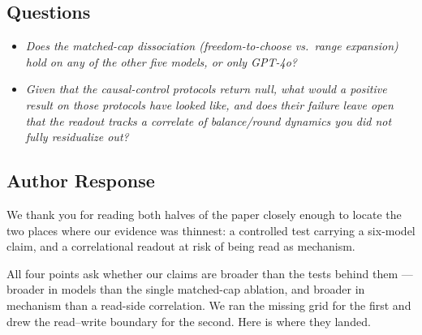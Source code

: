 \subsection*{Questions}

\begin{itemize}
\item[\textbf{Q1.}] \itshape Does the matched-cap dissociation (freedom-to-choose vs.\ range
expansion) hold on any of the other five models, or only GPT-4o?
\end{itemize}


\begin{itemize}
\item[\textbf{Q2.}] \itshape Given that the causal-control protocols return null, what would a
positive result on those protocols have looked like, and does their failure leave open that the
readout tracks a correlate of balance/round dynamics you did not fully residualize out?
\end{itemize}


\redrule

\subsection*{\color{red!60!black}Author Response}

We thank you for reading both halves of the paper closely enough to locate the two places where
our evidence was thinnest: a controlled test carrying a six-model claim, and a correlational
readout at risk of being read as mechanism.

All four points ask whether our claims are broader than the tests behind them --- broader in
models than the single matched-cap ablation, and broader in mechanism than a read-side
correlation. We ran the missing grid for the first and drew the read--write boundary for the
second. Here is where they landed.

